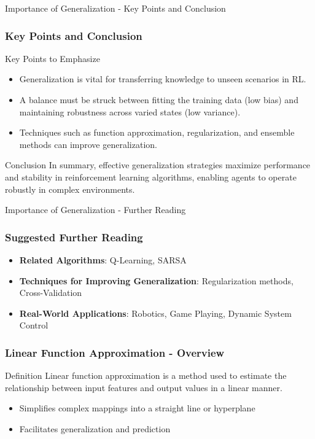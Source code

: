 \documentclass[aspectratio=169]{beamer}
\begin{document}
\begin{frame}[fragile]{Importance of Generalization - Key Points and Conclusion}
    \frametitle{Key Points and Conclusion}
    \begin{block}{Key Points to Emphasize}
        \begin{itemize}
            \item Generalization is vital for transferring knowledge to unseen scenarios in RL.
            \item A balance must be struck between fitting the training data (low bias) and maintaining robustness across varied states (low variance).
            \item Techniques such as function approximation, regularization, and ensemble methods can improve generalization.
        \end{itemize}
    \end{block}

    \begin{block}{Conclusion}
        In summary, effective generalization strategies maximize performance and stability in reinforcement learning algorithms, enabling agents to operate robustly in complex environments.
    \end{block}
\end{frame}

\begin{frame}[fragile]{Importance of Generalization - Further Reading}
    \frametitle{Suggested Further Reading}
    \begin{itemize}
        \item \textbf{Related Algorithms}: Q-Learning, SARSA
        \item \textbf{Techniques for Improving Generalization}: Regularization methods, Cross-Validation
        \item \textbf{Real-World Applications}: Robotics, Game Playing, Dynamic System Control
    \end{itemize}
\end{frame}

\begin{frame}[fragile]
    \frametitle{Linear Function Approximation - Overview}
    \begin{block}{Definition}
        Linear function approximation is a method used to estimate the relationship between input features and output values in a linear manner. 
    \end{block}
    \begin{itemize}
        \item Simplifies complex mappings into a straight line or hyperplane
        \item Facilitates generalization and prediction
    \end{itemize}
\end{frame}
\end{document}

